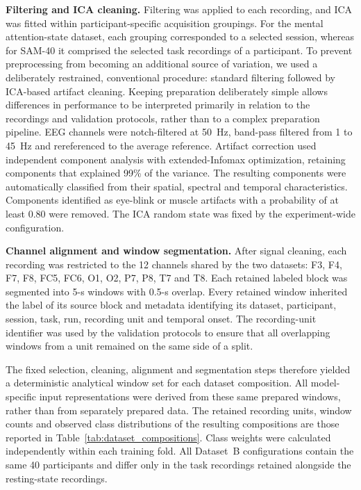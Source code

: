 \documentclass[10pt,letterpaper]{article}
\newcommand{\rev}[1]{#1}
\begin{document}
\rev{\textbf{Filtering and ICA cleaning.} Filtering was applied to each
recording, and ICA was fitted within participant-specific acquisition
groupings. For the mental attention-state dataset, each grouping corresponded
to a selected session, whereas for SAM-40 it comprised the selected task recordings
of a participant. To prevent preprocessing from becoming an additional source
of variation, we used a deliberately restrained, conventional procedure:
standard filtering followed by ICA-based artifact cleaning. Keeping
preparation deliberately simple allows differences in performance to be
interpreted primarily in relation to the recordings and validation protocols,
rather than to a complex preparation pipeline. EEG channels were notch-filtered
at 50~Hz, band-pass filtered from 1 to 45~Hz and rereferenced to the average
reference. Artifact correction used independent component analysis with
extended-Infomax optimization, retaining components that explained 99\% of the
variance. The resulting components were automatically classified from their
spatial, spectral and temporal characteristics. Components identified as
eye-blink or muscle artifacts with a probability of at least 0.80 were removed.
The ICA random state was fixed by the experiment-wide configuration.}

\rev{\textbf{Channel alignment and window segmentation.} After signal cleaning, each
recording was restricted to the 12 channels shared by
the two datasets: F3, F4, F7, F8, FC5, FC6, O1, O2, P7, P8, T7 and T8. Each
retained labeled block was segmented into 5-s windows with 0.5-s overlap.
Every retained window inherited the label of its source block and metadata identifying its
dataset, participant, session, task, run, recording unit and temporal onset.
The recording-unit identifier was used by the validation protocols to ensure
that all overlapping windows from a unit remained on the same side of a split.}

\rev{The fixed selection, cleaning, alignment and segmentation steps therefore
yielded a deterministic analytical window set for each dataset composition.
All model-specific input representations were derived from these same prepared
windows, rather than from separately prepared data. The retained recording
units, window counts and observed class distributions of the resulting
compositions are those reported in Table~\ref{tab:dataset_compositions}. Class weights were calculated
independently within each training fold. All Dataset~B configurations contain the same 40 participants and
differ only in the task recordings retained alongside the resting-state
recordings.}
\end{document}

